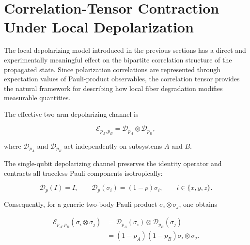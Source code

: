 
\section{Correlation-Tensor Contraction Under Local Depolarization}
\label{sec:local_depolarization_tensor_contraction}

The local depolarizing model introduced in the previous sections has a direct and experimentally meaningful effect on the bipartite correlation structure of the propagated state. Since polarization correlations are represented through expectation values of Pauli-product observables, the correlation tensor provides the natural framework for describing how local fiber degradation modifies measurable quantities.

\medskip

The effective two-arm depolarizing channel is

\begin{equation}
\mathcal{E}_{p_A,p_B}
=
\mathcal{D}_{p_A}
\otimes
\mathcal{D}_{p_B},
\label{eq:two_arm_depolarizing_channel}
\end{equation}

where \( \mathcal{D}_{p_A} \) and \( \mathcal{D}_{p_B} \) act independently on subsystems \( A \) and \( B \).

\medskip

The single-qubit depolarizing channel preserves the identity operator and contracts all traceless Pauli components isotropically:

\begin{equation}
\mathcal{D}_{p}(I)=I,
\qquad
\mathcal{D}_{p}(\sigma_i)
=
(1-p)\sigma_i,
\qquad
i\in\{x,y,z\}.
\label{eq:single_qubit_depolarizing_pauli_action}
\end{equation}

Consequently, for a generic two-body Pauli product \( \sigma_i\otimes\sigma_j \), one obtains

\begin{align}
\mathcal{E}_{p_A,p_B}
\left(
\sigma_i\otimes\sigma_j
\right)
&=
\mathcal{D}_{p_A}(\sigma_i)
\otimes
\mathcal{D}_{p_B}(\sigma_j)
\nonumber
\\
&=
(1-p_A)(1-p_B)
\sigma_i\otimes\sigma_j.
\label{eq:two_body_pauli_contraction}
\end{align}

